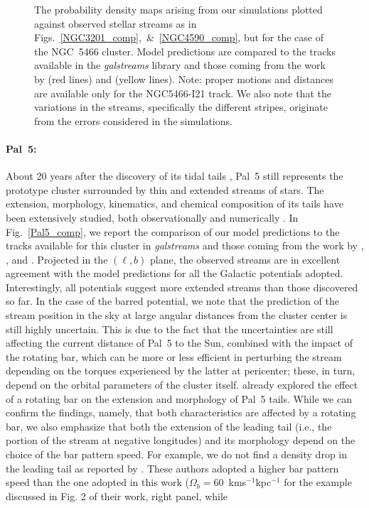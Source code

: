 \begin{figure}
                \caption{The probability density maps arising from our simulations plotted against observed stellar streams as in Figs.~\ref{NGC3201_comp},~\&~\ref{NGC4590_comp}, but for the case of the NGC~5466 cluster. Model predictions are compared to the tracks available in the \textit{galstreams} library and those coming from the work by  \citet{grillmair06c} (red lines) and \citet{ibata21} (yellow lines). Note: proper motions and distances are available only for the NGC5466-I21 track. We also note that the variations in the streams, specifically the different stripes, originate from the errors considered in the simulations.\label{NGC5466_comp}}
            \end{figure}  
            \onecolumn          
            
            \paragraph{Pal~5: } About 20 years after the discovery of its tidal tails \citep{odenkirchen01, odenkirchen03}, Pal~5 still represents the prototype cluster surrounded by thin and extended streams of stars. The extension, morphology, kinematics, and chemical composition of its tails have been extensively studied, both observationally and numerically \citep{odenkirchen02, rockosi02, dehnen04, koch04, grillmair06, odenkirchen09, mastrobuono12, kupper15, kuzma15, fritz15, ibata16, ishigaki16, thomas16, koch17, ibata17, pearson17, pricewhelan19, starkman20, bonaca20b, ibata21,  philips22, kuzma22}. In Fig.~\ref{Pal5_comp}, we report the comparison of our model predictions to the tracks available for this cluster in \textit{galstreams} and  those coming from the work by \citet{pricewhelan19}, \citet{starkman20}, and \citet{ibata21}. Projected in the $(\ell, b)$ plane, the observed streams are in excellent agreement with the model predictions for all the Galactic potentials adopted. Interestingly, all potentials suggest more extended streams than those discovered so far. In the case of the barred potential, we note that the prediction of the stream position in the sky at large angular distances from the cluster center is still highly uncertain. This is due to the fact that the uncertainties are still affecting the current distance of Pal~5 to the Sun, combined with the impact of the rotating bar, which can be more or less efficient in perturbing the stream depending on the torques experienced by the latter at pericenter; these, in turn, depend on the orbital parameters of the cluster itself. \citet{pearson17} already explored the effect of a rotating bar on the extension and morphology of Pal~5 tails. While we can confirm the \citet{pearson17} findings, namely, that both characteristics are affected by a rotating bar, we also emphasize that both the extension of the leading tail (i.e., the portion of the stream at negative longitudes) and its morphology depend on the choice of the bar pattern speed. For example, we do not find a density drop in the leading tail as reported by  \citet{pearson17}. These authors adopted a higher bar pattern speed than the one adopted in this work ($\Omega_b=60$~kms$^{-1}$kpc$^{-1}$ for the example discussed in Fig. 2 of their work, right panel, while 